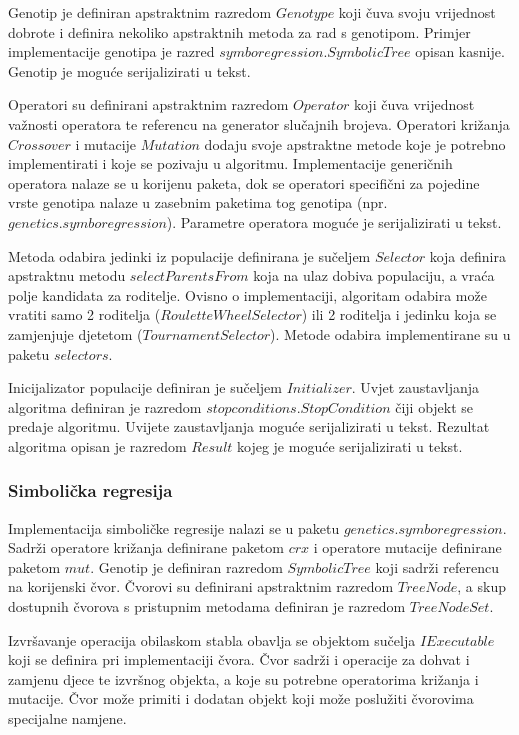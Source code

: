 \documentclass[times, utf8, numeric, diplomski]{fer}
\begin{document}
Genotip je definiran apstraktnim razredom $Genotype$ koji čuva svoju vrijednost dobrote i definira nekoliko apstraktnih metoda za rad s genotipom. Primjer implementacije genotipa je razred $symboregression.SymbolicTree$ opisan kasnije. Genotip je moguće serijalizirati u tekst.

Operatori su definirani apstraktnim razredom $Operator$ koji čuva vrijednost važnosti operatora te referencu na generator slučajnih brojeva. Operatori križanja $Crossover$ i mutacije $Mutation$ dodaju svoje apstraktne metode koje je potrebno implementirati i koje se pozivaju u algoritmu. Implementacije generičnih operatora nalaze se u korijenu paketa, dok se operatori specifični za pojedine vrste genotipa nalaze u zasebnim paketima tog genotipa (npr. $genetics.symboregression$). Parametre operatora moguće je serijalizirati u tekst.

Metoda odabira jedinki iz populacije definirana je sučeljem $Selector$ koja definira apstraktnu metodu $selectParentsFrom$ koja na ulaz dobiva populaciju, a vraća polje kandidata za roditelje. Ovisno o implementaciji, algoritam odabira može vratiti samo 2 roditelja ($RouletteWheelSelector$) ili 2 roditelja i jedinku koja se zamjenjuje djetetom ($TournamentSelector$). Metode odabira implementirane su u paketu $selectors$.

Inicijalizator populacije definiran je sučeljem $Initializer$. Uvjet zaustavljanja algoritma definiran je razredom $stopconditions.StopCondition$ čiji objekt se predaje algoritmu. Uvijete zaustavljanja moguće serijalizirati u tekst. Rezultat algoritma opisan je razredom $Result$ kojeg je moguće serijalizirati u tekst.

\subsubsection{Simbolička regresija}
Implementacija simboličke regresije nalazi se u paketu $genetics.symboregression$. Sadrži operatore križanja definirane paketom $crx$ i operatore mutacije definirane paketom $mut$. Genotip je definiran razredom $SymbolicTree$ koji sadrži referencu na korijenski čvor. Čvorovi su definirani apstraktnim razredom $TreeNode$, a skup dostupnih čvorova s pristupnim metodama definiran je razredom $TreeNodeSet$.

Izvršavanje operacija obilaskom stabla obavlja se objektom sučelja $IExecutable$ koji se definira pri implementaciji čvora. Čvor sadrži i operacije za dohvat i zamjenu djece te izvršnog objekta, a koje su potrebne operatorima križanja i mutacije. Čvor može primiti i dodatan objekt koji može poslužiti čvorovima specijalne namjene.
\end{document}
